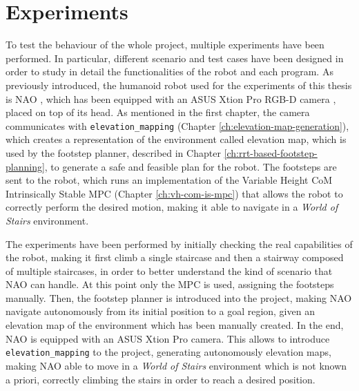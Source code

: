 \chapter{Experiments}
\label{ch:experiments}

To test the behaviour of the whole project, multiple experiments have been 
performed. In particular, different scenario and test cases have been designed 
in order to study in detail the functionalities of the robot and each program.
As previously introduced, the humanoid robot used for the experiments of this 
thesis is NAO \cite{NAOdesign}, which has been equipped with an ASUS Xtion 
Pro RGB-D camera \cite{ASUSXtionProWebsite}, placed on top of its head.
As mentioned in the first chapter, the camera communicates with
\texttt{elevation\_mapping} (Chapter \ref{ch:elevation-map-generation}),
which creates a representation of the environment
called elevation map, which is used by the footstep planner, described in 
Chapter \ref{ch:rrt-based-footstep-planning}, to generate a safe and feasible 
plan for the robot. The footsteps are sent to the robot, which runs an 
implementation of the Variable Height CoM Intrinsically Stable MPC (Chapter 
\ref{ch:vh-com-is-mpc}) that allows the robot to correctly perform the 
desired motion, making it able to navigate in a \textit{World 
of Stairs} environment.

The experiments have been performed by initially checking the real capabilities 
of the robot, making it first climb a single staircase and then a stairway 
composed of multiple staircases, in order to better understand 
the kind of scenario that NAO can handle. At this point only the MPC is 
used, assigning the footsteps manually. Then, the footstep planner is 
introduced into the project, making NAO navigate autonomously from its initial 
position to a goal region, given an elevation map of the environment which has 
been manually created. In the end, NAO is equipped with an ASUS Xtion Pro 
camera. This allows to introduce \texttt{elevation\_mapping} to the project,
generating autonomously elevation maps, making NAO able to move in 
a \textit{World of Stairs} environment which is not known a priori,
correctly climbing the stairs in order to reach a desired position.

